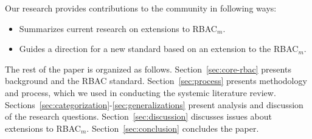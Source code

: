 Our research provides contributions to the community in following ways:

\begin{itemize}
\setlength{\itemsep}{0.25pt}
\item Summarizes current research on extensions to RBAC$_{m}$.
\item Guides a direction for a new standard based on an extension to the RBAC$_{m}$.
\end{itemize}

The rest of the paper is organized as follows. 
Section~\ref{sec:core-rbac} presents background and the RBAC standard. 
Section~\ref{sec:process} presents methodology and process, which we used in conducting the systemic literature review. 
Sections~\ref{sec:categorization}-\ref{sec:generalizations} present analysis and discussion of the research questions. 
Section~\ref{sec:discussion} discusses issues about extensions to RBAC$_{m}$.
Section~\ref{sec:conclusion} concludes the paper.
